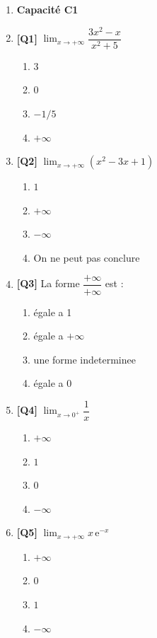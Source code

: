 \begin{enumerate}

\item[] \textbf{Capacité C1}

\item \textbf{[Q1]} $\lim_{x \to +\infty} \dfrac{3x^2 - x}{x^2 + 5}$
  \begin{enumerate}[label=\Alph*.]
    \item $3$
    \item $0$
    \item $-1/5$
    \item $+\infty$
  \end{enumerate}

\item \textbf{[Q2]} $\lim_{x \to +\infty} (x^2 - 3x + 1)$
  \begin{enumerate}[label=\Alph*.]
    \item $1$
    \item $+\infty$
    \item $-\infty$
    \item On ne peut pas conclure
  \end{enumerate}

\item \textbf{[Q3]} La forme $\dfrac{+\infty}{+\infty}$ est :
  \begin{enumerate}[label=\Alph*.]
    \item égale a 1
    \item égale a $+\infty$
    \item une forme indeterminee
    \item égale a 0
  \end{enumerate}

\item \textbf{[Q4]} $\lim_{x \to 0^+} \dfrac{1}{x}$
  \begin{enumerate}[label=\Alph*.]
    \item $+\infty$
    \item $1$
    \item $0$
    \item $-\infty$
  \end{enumerate}

\item \textbf{[Q5]} $\lim_{x \to +\infty} x\,\mathrm{e}^{-x}$
  \begin{enumerate}[label=\Alph*.]
    \item $+\infty$
    \item $0$
    \item $1$
    \item $-\infty$
  \end{enumerate}


\end{enumerate}
